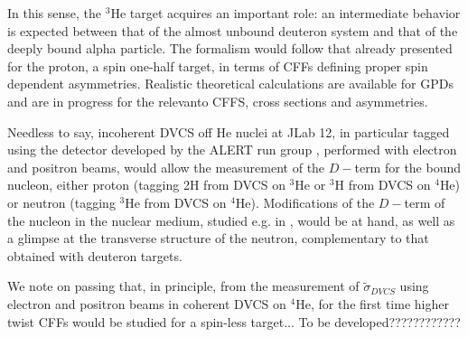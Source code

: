\documentclass[times, twoside]{PosWhiPap}
\begin{document}
\vskip 0.5cm

In this sense, the $^3$He target acquires an important role: an intermediate 
behavior is expected between that of the almost unbound deuteron system and 
that of the deeply bound alpha particle. The formalism would follow that 
already presented for the proton, a spin one-half target, in terms of CFFs 
defining proper spin dependent asymmetries. Realistic theoretical calculations
are available for GPDs 
\cite{Scopetta:2004kj,Scopetta:2009sn,Rinaldi:2012ft,Rinaldi:2012pj} and are in 
progress for the relevanto CFFS, cross sections and asymmetries. 

\vskip 0.5cm

Needless to say, incoherent DVCS off He nuclei at JLab 12, in particular tagged using the detector
developed by the ALERT run group \cite{Armstrong:2017zcm}, performed with 
electron and positron beams, would allow the measurement of the $D-$term for 
the bound nucleon, either proton (tagging 2H from DVCS on $^3$He or $^3$H from 
DVCS on $^4$He) or neutron (tagging $^3$He from DVCS on $^4$He). Modifications 
of the $D-$term of the nucleon in the nuclear medium, studied e.g. in 
\cite{Jung:2014jja}, would be at hand, as well as a glimpse at the transverse 
structure of the neutron, complementary to that obtained with deuteron targets.

\vskip 0.5cm

We note on passing that, in principle, from the measurement of $\tilde 
\sigma_{DVCS}$ using electron and positron beams in coherent DVCS on $^4$He,
for the first time higher twist CFFs would be studied for a spin-less target...
To be developed????????????







\end{document}
